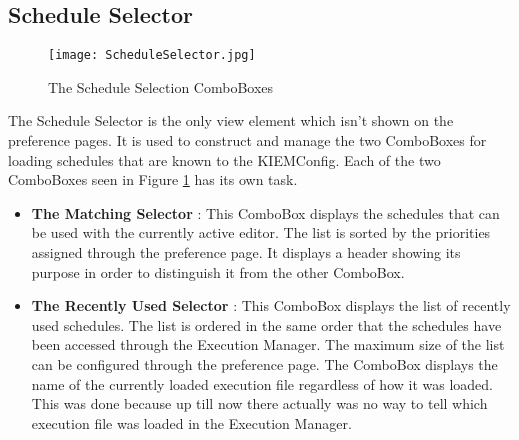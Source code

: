 \subsection{Schedule Selector}
\label{section:ScheduleSelector}
\begin{figure}
  \centering
  \texttt{[image: ScheduleSelector.jpg]}
  \caption[The Schedule Selection ComboBoxes]%
  {The Schedule Selection ComboBoxes\protect}
  \label{fig:ScheduleSelector}
\end{figure}
The Schedule Selector is the only view element which isn't shown on the preference pages. It is used
to construct and manage the two ComboBoxes for loading schedules that are known to
the \ac{KIEMConfig}. Each of the two ComboBoxes seen in Figure \ref{fig:ScheduleSelector} has its own task.
\begin{itemize}
 \item \textbf{The Matching Selector} : This ComboBox displays the schedules that can be used with
the currently active editor. The list is sorted by the priorities assigned through the preference page.
It displays a header showing its purpose in order to distinguish it from the other ComboBox.
 \item \textbf{The Recently Used Selector} : This ComboBox displays the list of recently used schedules.
The list is ordered in the same order that the schedules have been accessed through the Execution Manager.
The maximum size of the list can be configured through the preference page. The ComboBox displays the name
of the currently loaded execution file regardless of how it was loaded. This was done because up till now 
there actually was no way to tell which execution file was loaded in the Execution Manager.
\end{itemize}


